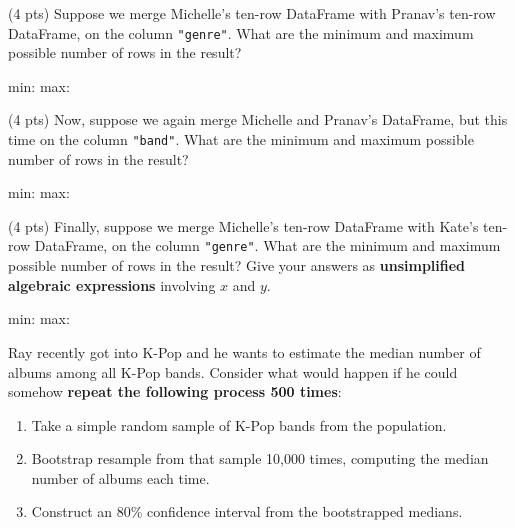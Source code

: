 \documentclass[twoside,12pt]{article}
\begin{document}
\begin{probset}
\begin{prob}[(12 pts)]
\begin{subprobset}
\begin{subprob}(4 pts)
Suppose we merge Michelle's ten-row DataFrame with Pranav's ten-row DataFrame, on the column \texttt{"genre"}. What are the minimum and maximum possible number of rows in the result?
    
    \begin{center}
        min:  \qquad
        max: 
    \end{center}
    
\end{subprob}
\begin{subprob}(4 pts)
    Now, suppose we again merge Michelle and Pranav's DataFrame, but this time on the column \texttt{"band"}. What are the minimum and maximum possible number of rows in the result?

    \begin{center}
        min:  \qquad
        max: 
    \end{center}
    
\end{subprob}
\begin{subprob}(4 pts)
    Finally, suppose we merge Michelle's ten-row DataFrame with Kate's ten-row DataFrame, on the column \texttt{"genre"}. What are the minimum and maximum possible number of rows in the result? Give your answers as \textbf{unsimplified algebraic expressions} involving $x$ and $y$.

    \begin{center}
        min:  \qquad
        max: 
    \end{center}
    
\end{subprob}
\end{subprobset}

\end{prob}

\newpage

\begin{prob}[(8 pts)]

Ray recently got into K-Pop and he wants to estimate the median number of albums among all K-Pop bands. Consider what would happen if he could somehow \textbf{repeat the following process 500 times}:

\begin{enumerate}
    \item Take a simple random sample of K-Pop bands from the population.
    \item Bootstrap resample from that sample 10{,}000 times, computing the median number of albums each time.
    \item Construct an 80\% confidence interval from the bootstrapped medians.
\end{enumerate}


\end{prob}
\end{probset}
\end{document}
